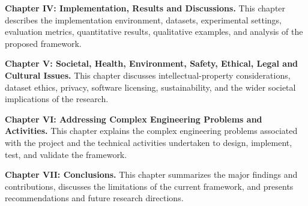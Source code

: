 \noindent
\textbf{Chapter IV: Implementation, Results and Discussions.}
This chapter describes the implementation environment, datasets, experimental settings, evaluation metrics, quantitative results, qualitative examples, and analysis of the proposed framework.

\noindent
\textbf{Chapter V: Societal, Health, Environment, Safety, Ethical, Legal and Cultural Issues.}
This chapter discusses intellectual-property considerations, dataset ethics, privacy, software licensing, sustainability, and the wider societal implications of the research.

\noindent
\textbf{Chapter VI: Addressing Complex Engineering Problems and Activities.}
This chapter explains the complex engineering problems associated with the project and the technical activities undertaken to design, implement, test, and validate the framework.

\noindent
\textbf{Chapter VII: Conclusions.}
This chapter summarizes the major findings and contributions, discusses the limitations of the current framework, and presents recommendations and future research directions.
